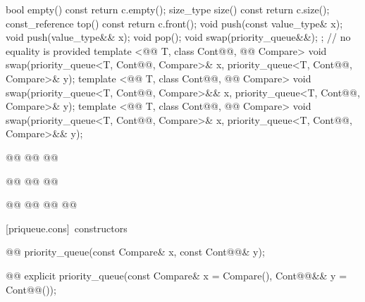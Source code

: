 \documentclass[american,twoside]{book}
\begin{document}
\begin{codeblock}
{{    bool      empty() const       { return c.empty(); }
    size_type size()  const       { return c.size(); }
    const_reference   top() const { return c.front(); }
    void push(const value_type& x);
    void push(value_type&& x);
    void pop();
    void swap(priority_queue&&);
  };
                // no equality is provided
  template <@@ T, class Cont@@, @@ Compare>
    void swap(priority_queue<T, Cont@@, Compare>& x, priority_queue<T, Cont@@, Compare>& y);
  template <@@ T, class Cont@@, @@ Compare>
    void swap(priority_queue<T, Cont@@, Compare>&& x, priority_queue<T, Cont@@, Compare>& y);
  template <@@ T, class Cont@@, @@ Compare>
    void swap(priority_queue<T, Cont@@, Compare>& x, priority_queue<T, Cont@@, Compare>&& y);

  @@
    @@
    @@

  @@
    @@
      @@

  @@
    @@
      @@
      @@
}
\end{codeblock}

[priqueue.cons]{\ constructors}

%
\begin{itemdecl}
@@ priority_queue(const Compare& x, const Cont@@& y);

@@ 
explicit priority_queue(const Compare& x = Compare(), Cont@@&& y = Cont@@());
\end{itemdecl}
\end{document}
